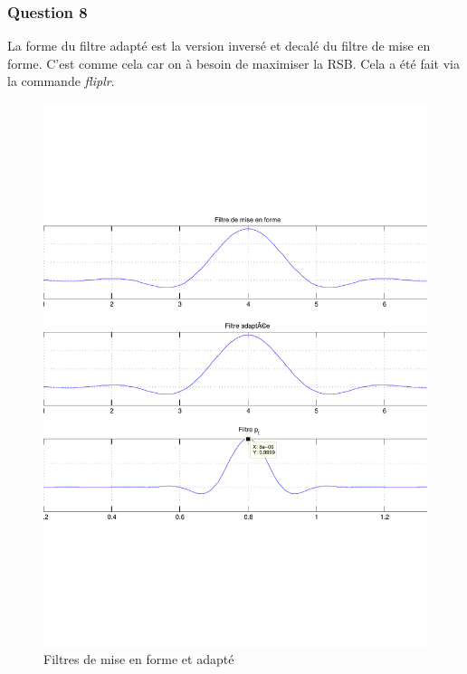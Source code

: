 \documentclass[a4paper,11pt]{article}
\begin{document}
\subsubsection*{Question 8}
La forme du filtre adapté est la version inversé et decalé du filtre de mise en forme. C'est comme cela car on à besoin de maximiser la RSB. Cela a été fait via la commande \emph{fliplr}.
\begin{figure}
	\begin{center}
	\includegraphics[scale=0.5]{Q8-1.pdf}
	\caption{Filtres de mise en forme et adapté}
	\label{fig:ques8-1}
	\end{center}
\end{figure} 
\end{document}
